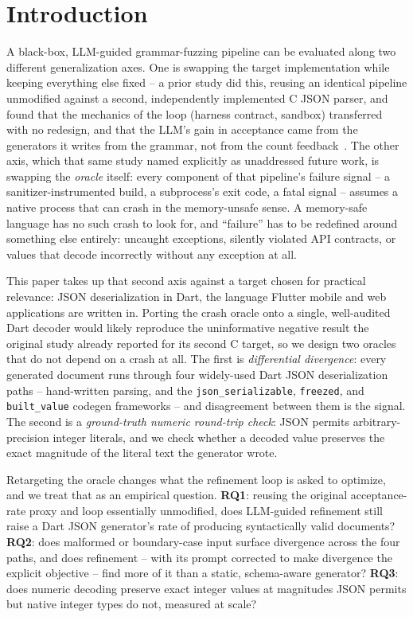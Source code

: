 \section{Introduction}

A black-box, LLM-guided grammar-fuzzing pipeline can be evaluated along two
different generalization axes. One is swapping the target implementation
while keeping everything else fixed -- a prior study did this, reusing an
identical pipeline unmodified against a second, independently implemented C
JSON parser, and found that the mechanics of the loop (harness contract,
sandbox) transferred with no redesign, and that the LLM's gain in acceptance
came from the generators it writes from the grammar, not from the count
feedback~\priorworkcite. The
other axis, which that same study named explicitly as unaddressed future
work, is swapping the \emph{oracle} itself: every component of that
pipeline's failure signal -- a sanitizer-instrumented build, a subprocess's
exit code, a fatal signal -- assumes a native process that can crash in the
memory-unsafe sense. A memory-safe language has no such crash to look for,
and ``failure'' has to be redefined around something else entirely:
uncaught exceptions, silently violated API contracts, or values that
decode incorrectly without any exception at all.

This paper takes up that second axis against a target chosen for practical
relevance: JSON deserialization in Dart, the language Flutter mobile and web
applications are written in. Porting the crash oracle onto a single,
well-audited Dart decoder would likely reproduce the uninformative negative
result the original study already reported for its second C target, so we
design two oracles that do not depend on a crash at all. The first is
\emph{differential divergence}: every generated document runs through four
widely-used Dart JSON deserialization paths --
hand-written parsing, and the \texttt{json\_serializable}, \texttt{freezed},
and \texttt{built\_value} codegen frameworks -- and disagreement between
them is the signal. The second is a \emph{ground-truth numeric round-trip
check}: JSON permits arbitrary-precision integer literals, and we check
whether a decoded value preserves the exact magnitude of the literal text
the generator wrote.

Retargeting the oracle changes what the refinement loop is asked to
optimize, and we treat that as an empirical question. \textbf{RQ1}: reusing
the original acceptance-rate proxy and loop essentially unmodified, does
LLM-guided refinement still raise a Dart JSON generator's rate of producing
syntactically valid documents? \textbf{RQ2}: does malformed or
boundary-case input surface divergence across the four paths, and does
refinement -- with its prompt corrected to make divergence the explicit
objective -- find more of it than a static, schema-aware generator?
\textbf{RQ3}: does numeric decoding preserve exact integer values at
magnitudes JSON permits but native integer types do not, measured at scale?

